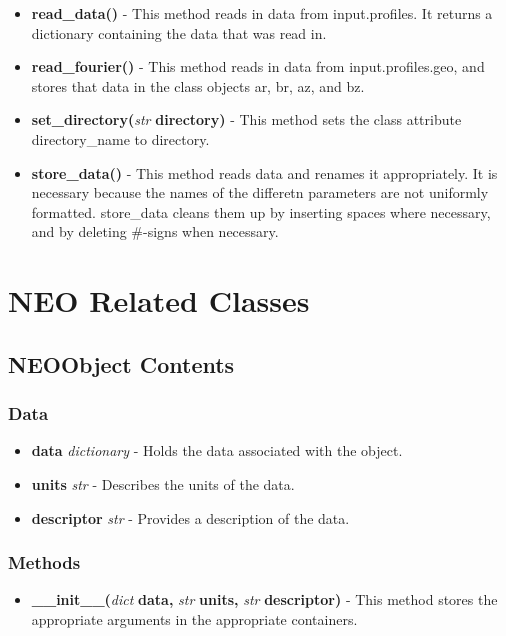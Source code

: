 \documentclass{article}
\begin{document}
\begin{itemize}
\begin{itemize}
\end{itemize}
\item \textbf{read\_data()} - This method reads in data from input.profiles.  It returns a dictionary containing the data that was read in.
\item \textbf{read\_fourier()} - This method reads in data from input.profiles.geo, and stores that data in the class objects ar, br, az, and bz.
\item \textbf{set\_directory(}\emph{str}\textbf{ directory)} - This method sets the class attribute directory\_name to directory.
\item \textbf{store\_data()} - This method reads data and renames it appropriately.  It is necessary because the names of the differetn parameters are not uniformly formatted.  store\_data cleans them up by inserting spaces where necessary, and by deleting \#-signs when necessary.
\end{itemize}

\newpage

\section{NEO Related Classes}

\subsection{NEOObject Contents}
\subsubsection{Data}
\begin{itemize}
\item \textbf{data} \emph{dictionary} - Holds the data associated with the object.
\item \textbf{units} \emph{str} - Describes the units of the data.
\item \textbf{descriptor} \emph{str} - Provides a description of the data.
\end{itemize}
\subsubsection{Methods}
\begin{itemize}
\item \textbf{\_\_init\_\_(}\emph{dict}\textbf{ data,}\emph{ str}\textbf{ units,}\emph{ str}\textbf{ descriptor)} - This method stores the appropriate arguments in the appropriate containers.
\end{itemize}
\end{document}
